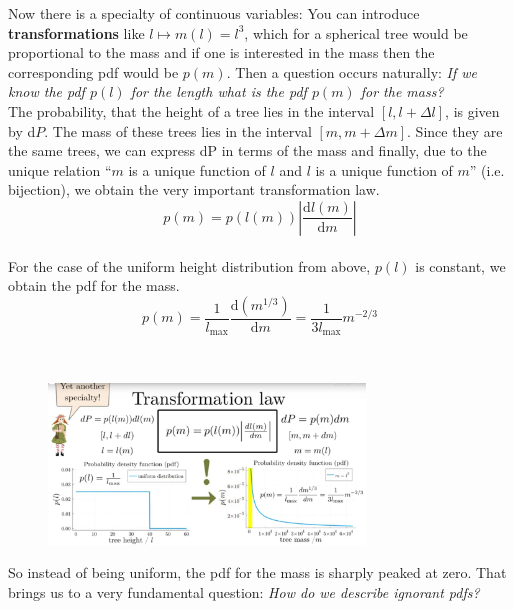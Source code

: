 \documentclass[12pt, a4paper]{scrartcl}
\begin{document}
Now there is a specialty of continuous variables: You can introduce \textbf{transformations} like $l\mapsto m(l)=l^3$, which for a spherical tree would be proportional
to the mass and if one is interested in the mass then the corresponding pdf would be $p(m)$. Then a question occurs naturally: \textit{If we know the pdf $p(l)$ for the length what is the pdf $p(m)$ for the mass?}\\

The probability, that the height of a tree lies in the interval $[l,l+\Delta l]$, is given by d$P$.
The mass of these trees lies in the interval $[m,m+\Delta m]$. Since they are the same trees, we can express dP in terms of the mass and finally, due to the unique relation ``$m$ is a unique function of $l$ and $l$ is a unique function of $m$'' (i.e. bijection), we obtain the very important transformation law.\\
\begin{equation*}\boxed{p(m)=p(l(m))\left|\frac{\text{d}l(m)}{\text{d}m}\right|
}\end{equation*}\\

For the case of the uniform height distribution from above, $p(l)$ is constant, we
obtain the pdf for the mass. \[p(m)=\frac{1}{l_{\text{max}}}\frac{\text{d}(m^{1/3})}{\text{d}m}=\frac{1}{3l_{\text{max}}}m^{-2/3}\]

\\

 \begin{figure}[H]
	\centering
	\includegraphics[width=0.75\textwidth]{8_2.png}
\end{figure}
So instead of being uniform, the pdf for the mass is sharply peaked at zero.
That brings us to a very fundamental question: \textit{How do we describe ignorant pdfs?}\\
\end{document}

